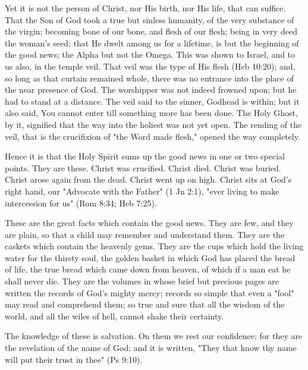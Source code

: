 \documentclass[
]{book}
\begin{document}
Yet it is not the person of Christ, nor His birth, nor His life, that can suffice. That the Son of God took a true but sinless humanity, of the very substance of the virgin; becoming bone of our bone, and flesh of our flesh; being in very deed the woman's seed; that He dwelt among us for a lifetime, is but the beginning of the good news; the Alpha but not the Omega. This was shown to Israel, and to us also, in the temple veil. That veil was the type of His flesh (Heb 10:20); and, so long as that curtain remained whole, there was no entrance into the place of the near presence of God. The worshipper was not indeed frowned upon; but he had to stand at a distance. The veil said to the sinner, Godhead is within; but it also said, You cannot enter till something more has been done. The Holy Ghost, by it, signified that the way into the holiest was not yet open. The rending of the veil, that is the crucifixion of "the Word made flesh," opened the way completely.

Hence it is that the Holy Spirit sums up the good news in one or two special points. They are these. Christ was crucified. Christ died. Christ was buried. Christ arose again from the dead. Christ went up on high. Christ sits at God's right hand, our "Advocate with the Father" (1 Jn 2:1), "ever living to make intercession for us" (Rom 8:34; Heb 7:25).

These are the great facts which contain the good news. They are few, and they are plain, so that a child may remember and understand them. They are the caskets which contain the heavenly gems. They are the cups which hold the living water for the thirsty soul, the golden basket in which God has placed the bread of life, the true bread which came down from heaven, of which if a man eat he shall never die. They are the volumes in whose brief but precious pages are written the records of God's mighty mercy; records so simple that even a "fool" may read and comprehend them; so true and sure that all the wisdom of the world, and all the wiles of hell, cannot shake their certainty.

The knowledge of these is salvation. On them we rest our confidence; for they are the revelation of the name of God; and it is written, "They that know thy name will put their trust in thee" (Ps 9:10).
\end{document}

